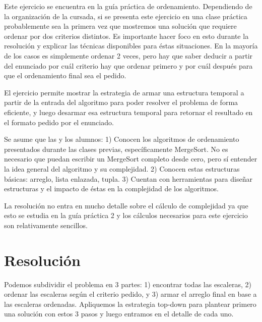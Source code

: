 Este ejercicio se encuentra en la guía práctica de ordenamiento. Dependiendo de la organización de la cursada, si se presenta este ejercicio en una clase práctica probablemente sea la primera vez que mostremos una solución que requiere ordenar por dos criterios distintos. Es importante hacer foco en esto durante la resolución y explicar las técnicas disponibles para éstas situaciones. En la mayoría de los casos es simplemente ordenar 2 veces, pero hay que saber deducir a partir del enunciado por cuál criterio hay que ordenar primero y por cuál después para que el ordenamiento final sea el pedido.

El ejercicio permite mostrar la estrategia de armar una estructura temporal a partir de la entrada del algoritmo para poder resolver el problema de forma eficiente, y luego desarmar esa estructura temporal para retornar el resultado en el formato pedido por el enunciado.

Se asume que las y los alumnos: 1) Conocen los algoritmos de ordenamiento presentados durante las clases previas, específicamente MergeSort. No es necesario que puedan escribir un MergeSort completo desde cero, pero sí entender la idea general del algoritmo y su complejidad. 2) Conocen estas estructuras básicas: arreglo, lista enlazada, tupla. 3) Cuentan con herramientas para diseñar estructuras y el impacto de éstas en la complejidad de los algoritmos.

La resolución no entra en mucho detalle sobre el cálculo de complejidad ya que esto se estudia en la guía práctica 2 y los cálculos necesarios para este ejercicio son relativamente sencillos.

\section*{Resolución}



Podemos subdividir el problema en 3 partes: 1) encontrar todas las escaleras, 2) ordenar las escaleras según el criterio pedido, y 3) armar el arreglo final en base a las escaleras ordenadas. Apliquemos la estrategia top-down para plantear primero una solución con estos 3 pasos y luego entramos en el detalle de cada uno.

